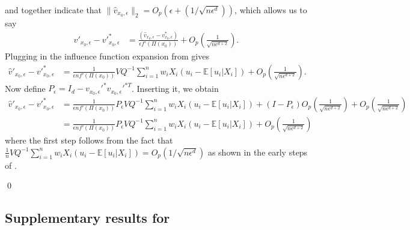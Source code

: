 \documentclass[11pt]{article}
\begin{document}
 and  together indicate that $\|\hat{v}_{x_0, \epsilon}\|_2 = O_p(\epsilon + (1/\sqrt{n\epsilon^d}))$, which allows us to say
\begin{align*}
    \hat{v}'_{x_0, \epsilon} - v'^*_{x_0, \epsilon} &= \frac{(\hat{v}_{x_0, \epsilon} - v^*_{x_0, \epsilon})}{\epsilon f'(\Pi(x_0))} + O_p\left(\frac{1}{\sqrt{n\epsilon^{d+2}}}\right).
\end{align*}
Plugging in the influence function expansion from  gives
\begin{align*}
    \hat{v}'_{x_0, \epsilon} - v'^*_{x_0, \epsilon} &= \frac{1}{\epsilon n f'(\Pi(x_0))}VQ^{-1}\sum_{i = 1}^nw_iX_i(u_i - \mathbb{E}[u_i|X_i]) + O_p\left(\frac{1}{\sqrt{n\epsilon^{d+2}}}\right).
\end{align*}
Now define $P_{\epsilon} = I_d - v_{x_0, \epsilon}'^{*}v_{x_0, \epsilon}'^{*T}$. Inserting it, we obtain
\begin{align*}
    \hat{v}'_{x_0, \epsilon} - v'^*_{x_0, \epsilon} &= \frac{1}{\epsilon n f'(\Pi(x_0))}P_{\epsilon}VQ^{-1}\sum_{i = 1}^nw_iX_i(u_i - \mathbb{E}[u_i|X_i]) + (I- P_{\epsilon})O_p\left(\frac{1}{\sqrt{n\epsilon^{d+2}}}\right) +  O_p\left(\frac{1}{\sqrt{n\epsilon^{d+2}}}\right) \\
    &= \frac{1}{\epsilon n f'(\Pi(x_0))}P_{\epsilon}VQ^{-1}\sum_{i = 1}^nw_iX_i(u_i - \mathbb{E}[u_i|X_i]) + O_p\left(\frac{1}{\sqrt{n\epsilon^{d+2}}}\right)
\end{align*}
where the first step follows from the fact that $\frac{1}{n}VQ^{-1}\sum_{i = 1}^nw_iX_i(u_i - \mathbb{E}[u_i|X_i]) = O_p(1/\sqrt{n\epsilon^d})$ as shown in the early steps of . 

\qed{}



\subsection{Supplementary results for }
\end{document}

